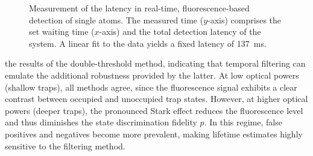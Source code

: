\documentclass[../Thesis-IJspeert.tex]{subfiles}
\begin{document}
\begin{figure}
	\vspace{0.8em}
	\centering
	\caption[Measurement of the latency in real-time, fluorescence-based atom detection]{Measurement of the latency in real-time, fluorescence-based detection of single atoms. The measured time ($y$-axis) comprises the set waiting time ($x$-axis) and the total detection latency of the system. A linear fit to the data yields a fixed latency of \SI{137}{\milli\second}.}
	\label{fig:latency} 
\end{figure}
the results of the double-threshold method, indicating that temporal filtering can emulate the additional robustness provided by the latter. At low optical powers (shallow traps), all methods agree, since the fluorescence signal exhibits a clear contrast between occupied and unoccupied trap states. However, at higher optical powers (deeper traps), the pronounced Stark effect reduces the fluorescence level and thus diminishes the state discrimination fidelity $p$. In this regime, false positives and negatives become more prevalent, making lifetime estimates highly sensitive to the filtering method.
\end{document}
